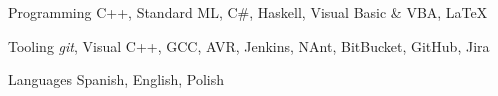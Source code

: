 

\begin{cvskills}

  \cvskill
    {Programming} %
    {C++, Standard ML, C\#, Haskell, Visual Basic \& VBA, LaTeX} %

  \cvskill
    {Tooling} %
    {\textit{git}, Visual C++, GCC, AVR, Jenkins, NAnt, BitBucket, GitHub, Jira} %

  \cvskill
    {Languages} %
    {Spanish, English, Polish} %

\end{cvskills}
